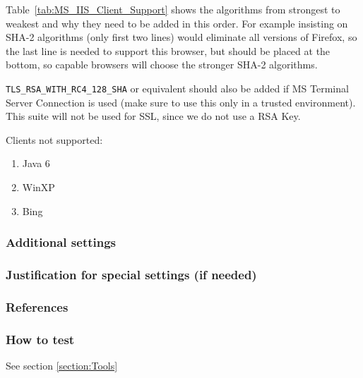 Table~\ref{tab:MS_IIS_Client_Support} shows the algorithms from
strongest to weakest and why they need to be added in this order. For
example insisting on SHA-2 algorithms (only first two lines) would
eliminate all versions of Firefox, so the last line is needed to
support this browser, but should be placed at the bottom, so capable
browsers will choose the stronger SHA-2 algorithms.

\verb|TLS_RSA_WITH_RC4_128_SHA| or equivalent should also be added if
MS Terminal Server Connection is used (make sure to use this only in a
trusted environment). This suite will not be used for SSL, since we do
not use a RSA Key.




Clients not supported:
\begin{enumerate}
\item Java 6
\item WinXP
\item Bing
\end{enumerate}

\subsubsection{Additional settings}


\subsubsection{Justification for special settings (if needed)}


\subsubsection{References}



\subsubsection{How to test}
See section \ref{section:Tools}



